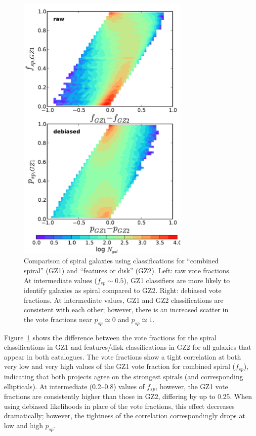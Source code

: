 \documentclass[useAMS,usenatbib]{mn2e}
\begin{document}
\begin{figure}
\includegraphics[angle=0,width=3.3in]{figures/gz1_gz2_trumpet.pdf}
\caption{Comparison of spiral galaxies using classifications for ``combined spiral'' (GZ1) and ``features or disk'' (GZ2). Left: raw vote fractions. At intermediate values ($f_{sp}\sim0.5$), GZ1 classifiers are more likely to identify galaxies as spiral compared to GZ2. Right: debiased vote fractions. At intermediate values, GZ1 and GZ2 classifications are consistent with each other; however, there is an increased scatter in the vote fractions near $p_{sp}\simeq0$ and $p_{sp}\simeq1$. 
\label{fig-trumpet}}
\end{figure}

Figure~\ref{fig-trumpet} shows the difference between the vote fractions for the spiral classifications in GZ1 and features/disk classifications in GZ2 for all galaxies that appear in both catalogues. The vote fractions show a tight correlation at both very low and very high values of the GZ1 vote fraction for combined spiral ($f_{sp}$), indicating that both projects agree on the strongest spirals (and corresponding ellipticals). At intermediate (0.2--0.8) values of $f_{sp}$, however, the GZ1 vote fractions are consistently higher than those in GZ2, differing by up to 0.25. When using debiased likelihoods in place of the vote fractions, this effect decreases dramatically; however, the tightness of the correlation correspondingly drops at low and high $p_{sp}$. 
\end{document}
